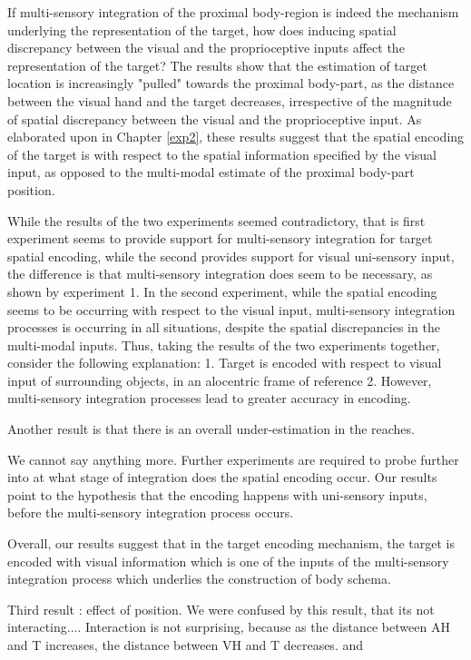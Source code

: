 If multi-sensory integration of the proximal body-region is indeed the mechanism underlying the representation of the target, how does inducing spatial discrepancy between the visual and the proprioceptive inputs affect the representation of the target? The results show that the estimation of target location is increasingly "pulled" towards the proximal body-part, as the distance between the visual hand and the target decreases, irrespective of the magnitude of spatial discrepancy between the visual and the proprioceptive input. As elaborated upon in Chapter \ref{exp2}, these results suggest that the spatial encoding of the target is with respect to the spatial information specified by the visual input, as opposed to the multi-modal estimate of the proximal body-part position. 

While the results of the two experiments seemed contradictory, that is first experiment seems to provide support for multi-sensory integration for target spatial encoding, while the second provides support for visual uni-sensory input, the difference is that multi-sensory integration does seem to be necessary, as shown by experiment 1. In the second experiment, while the spatial encoding seems to be occurring with respect to the visual input, multi-sensory integration processes is occurring in all situations, despite the spatial discrepancies in the multi-modal inputs. Thus, taking the results of the two experiments together, consider the following explanation:
1. Target is encoded with respect to visual input of surrounding objects, in an alocentric frame of reference
2. However, multi-sensory integration processes lead to greater accuracy in encoding.

Another result is that there is an overall under-estimation in the reaches. 

We cannot say anything more. Further experiments are required to probe further into at what stage of integration does the spatial encoding occur. Our results point to the hypothesis that the encoding happens with uni-sensory inputs, before the multi-sensory integration process occurs.

Overall, our results suggest that in the target encoding mechanism, the target is encoded with visual information which is one of the inputs of the multi-sensory integration process which underlies the construction of body schema. 








Third result : effect of position. We were confused by this result, that its not interacting....
Interaction is not surprising, because as the distance between AH and T increases, the distance between VH and T decreases. and 


